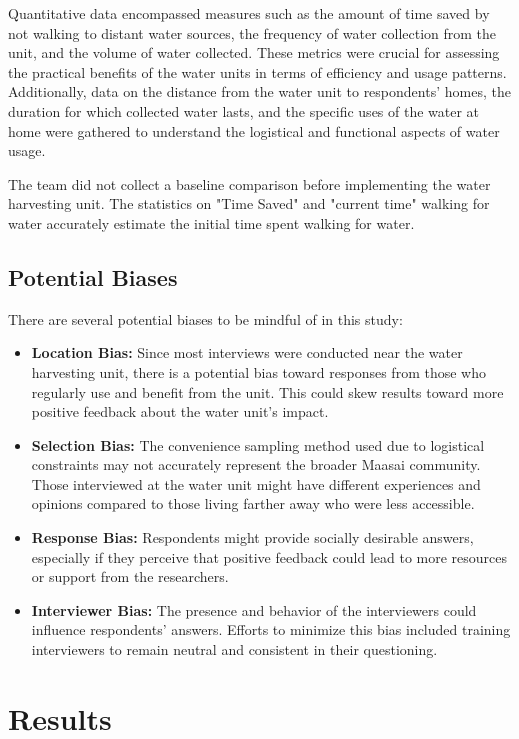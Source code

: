 \documentclass[10pt, twocolumn]{article}
\begin{document}
Quantitative data encompassed measures such as the amount of time saved by not walking to distant water sources, the frequency of water collection from the unit, and the volume of water collected. These metrics were crucial for assessing the practical benefits of the water units in terms of efficiency and usage patterns. Additionally, data on the distance from the water unit to respondents' homes, the duration for which collected water lasts, and the specific uses of the water at home were gathered to understand the logistical and functional aspects of water usage.

The team did not collect a baseline comparison before implementing the water harvesting unit. The statistics on "Time Saved" and "current time" walking for water accurately estimate the initial time spent walking for water.


\subsection{Potential Biases}

There are several potential biases to be mindful of in this study:

\begin{itemize}
    \item \textbf{Location Bias:} Since most interviews were conducted near the water harvesting unit, there is a potential bias toward responses from those who regularly use and benefit from the unit. This could skew results toward more positive feedback about the water unit's impact.
    \item \textbf{Selection Bias:} The convenience sampling method used due to logistical constraints may not accurately represent the broader Maasai community. Those interviewed at the water unit might have different experiences and opinions compared to those living farther away who were less accessible.
    \item \textbf{Response Bias:} Respondents might provide socially desirable answers, especially if they perceive that positive feedback could lead to more resources or support from the researchers.
    \item \textbf{Interviewer Bias:} The presence and behavior of the interviewers could influence respondents' answers. Efforts to minimize this bias included training interviewers to remain neutral and consistent in their questioning.
\end{itemize}

\section{Results}
\end{document}
